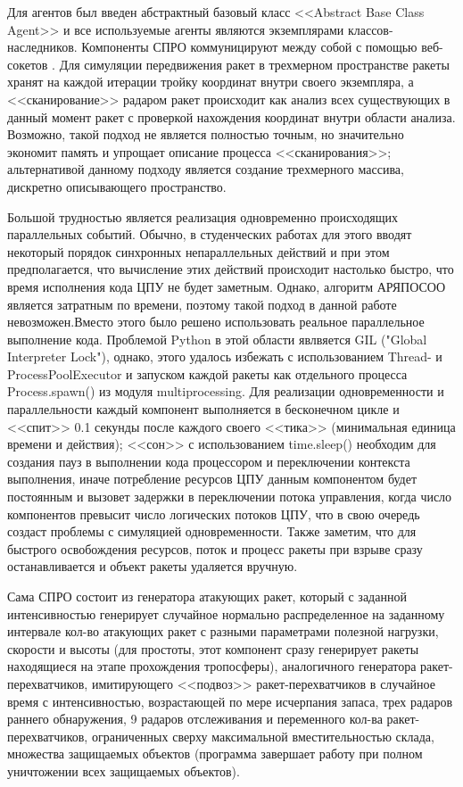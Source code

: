 Для агентов был введен абстрактный базовый класс <<Abstract Base Class Agent>> и  все используемые агенты являются экземплярами классов-наследников. Компоненты СПРО коммуницируют между собой с помощью веб-сокетов \cite{websockets:git}. Для симуляции передвижения ракет в трехмерном пространстве ракеты хранят на каждой итерации тройку координат внутри своего экземпляра, а <<сканирование>> радаром ракет происходит как анализ всех существующих в данный момент ракет с проверкой нахождения координат внутри области анализа. Возможно, такой подход не является полностью точным, но значительно экономит память и упрощает описание процесса <<сканирования>>; альтернативой данному подходу является создание трехмерного массива, дискретно описывающего пространство. 


Большой трудностью является реализация  одновременно происходящих параллельных событий. Обычно, в студенческих работах  для этого вводят некоторый порядок синхронных непараллельных действий и при этом предполагается, что вычисление этих действий происходит настолько быстро, что время исполнения кода ЦПУ не будет заметным. Однако, алгоритм АРЯПОСОО является затратным по времени, поэтому такой подход в данной работе невозможен.Вместо этого было решено использовать реальное параллельное выполнение кода. Проблемой Python в этой области явлвяется GIL ("Global Interpreter Lock"), однако, этого удалось избежать с использованием Thread- и ProcessPoolExecutor  и запуском каждой ракеты как отдельного процесса  Process.spawn() из модуля multiprocessing. Для реализации одновременности и параллельности каждый компонент выполняется в бесконечном цикле и <<спит>> 0.1 секунды после каждого своего <<тика>> (минимальная единица времени и действия); <<сон>>  с использованием time.sleep() необходим для создания пауз в выполнении кода процессором и переключении контекста выполнения, иначе  потребление ресурсов ЦПУ данным компонентом будет постоянным и вызовет задержки в переключении потока управления, когда число компонентов превысит число логических потоков ЦПУ, что в свою очередь создаст проблемы с симуляцией одновременности. Также заметим, что для быстрого освобождения ресурсов, поток и процесс ракеты при взрыве сразу останавливается и объект ракеты удаляется вручную.

Сама СПРО состоит из генератора атакующих ракет, который с заданной интенсивностью генерирует случайное нормально распределенное на заданному интервале кол-во атакующих ракет с разными параметрами полезной нагрузки, скорости и высоты (для простоты, этот компонент сразу генерирует ракеты находящиеся на этапе прохождения тропосферы), аналогичного генератора ракет-перехватчиков, имитирующего <<подвоз>>  ракет-перехватчиков в случайное время с интенсивностью, возрастающей по мере исчерпания запаса, трех радаров раннего обнаружения, 9 радаров отслеживания и переменного кол-ва ракет-перехватчиков, ограниченных сверху максимальной вместительностью склада, множества защищаемых объектов (программа завершает работу при полном уничтожении всех защищаемых объектов).


